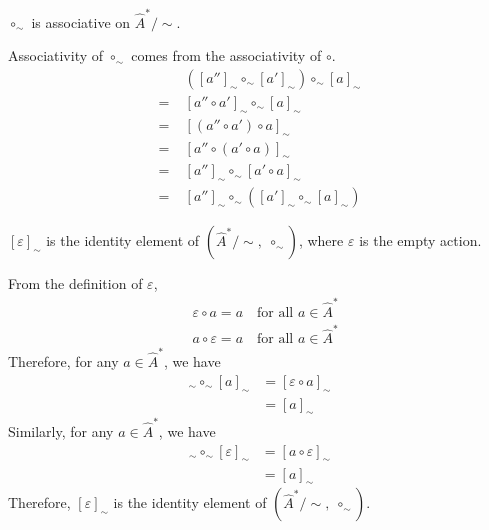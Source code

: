 \begin{propositionE}
\label{prp:circ_sim_associative}
    $\circ_{\sim}$ is associative on $\hat{A}^{\ast}/\sim$.
\end{propositionE}
\begin{proofE}
Associativity of $\circ_{\sim}$ comes from the associativity of $\circ$.
\begin{align}
         & ([a'']_{\sim} \circ_{\sim} [a']_{\sim}) \circ_{\sim} [a]_{\sim} \\
    = \; & [a'' \circ a']_{\sim} \circ_{\sim} [a]_{\sim}                   \\
    = \; & [ (a'' \circ a') \circ a ]_{\sim}                               \\
    = \; & [ a'' \circ (a' \circ a) ]_{\sim}                               \\
    = \; & [a'']_{\sim} \circ_{\sim} [a' \circ a]_{\sim}                   \\
    = \; & [a'']_{\sim} \circ_{\sim} ([a']_{\sim} \circ_{\sim} [a]_{\sim})
\end{align}
\end{proofE}


\begin{propositionE}
\label{prp:A_sim_identity}
    $[\varepsilon]_{\sim}$ is the identity element of $(\hat{A}^{\ast}/\sim, \; \circ_{\sim})$, where $\varepsilon$ is the empty action.
\end{propositionE}
\begin{proofE}
    From the definition of $\varepsilon$,
    \begin{align}
        & \varepsilon \circ a = a \quad \text{for all $a \in \hat{A}^{*}$} \\
        & a \circ \varepsilon = a \quad \text{for all $a \in \hat{A}^{*}$}
    \end{align}
    Therefore, for any $a \in \hat{A}^{\ast}$, we have
    \begin{align}
        [\varepsilon]_{\sim} \circ_{\sim} [a]_{\sim} & = [\varepsilon \circ a]_{\sim} \\
        & = [a]_{\sim}
    \end{align}
    Similarly, for any $a \in \hat{A}^{\ast}$, we have
    \begin{align}
        [a]_{\sim} \circ_{\sim} [\varepsilon]_{\sim} & = [a \circ \varepsilon]_{\sim} \\
        & = [a]_{\sim}
    \end{align}
    Therefore, $[\varepsilon]_{\sim}$ is the identity element of $(\hat{A}^{\ast}/\sim, \; \circ_{\sim})$.
\end{proofE}


